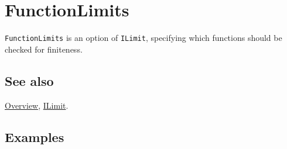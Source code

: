 \documentclass[../FeynCalcManual.tex]{subfiles}
\begin{document}
\hypertarget{functionlimits}{%
\section{FunctionLimits}\label{functionlimits}}

\texttt{FunctionLimits} is an option of \texttt{ILimit}, specifying
which functions should be checked for finiteness.

\subsection{See also}

\hyperlink{toc}{Overview}, \hyperlink{ilimit}{ILimit}.

\subsection{Examples}
\end{document}
